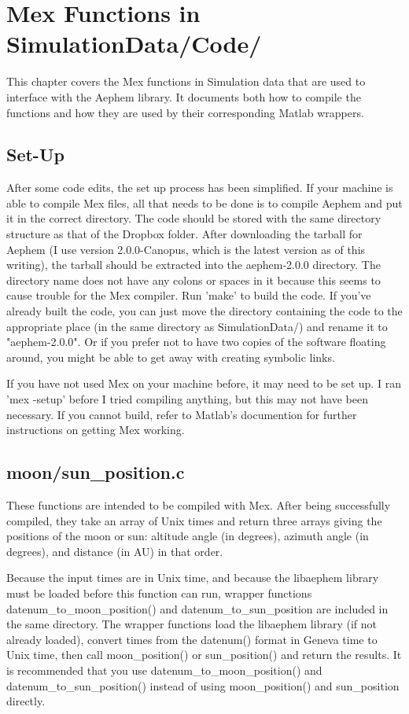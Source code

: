 \documentclass[12pt]{report}
\begin{document}
\chapter{Mex Functions in SimulationData/Code/}
\label{chap:mex_functions}
This chapter covers the Mex functions in Simulation data that are used to interface with the Aephem library.  It documents both how to compile the functions and how they are used by their corresponding Matlab wrappers.

\section{Set-Up}
After some code edits, the set up process has been simplified.  If your machine is able to compile Mex files, all that needs to be done is to compile Aephem and put it in the correct directory.  The code should be stored with the same directory structure as that of the Dropbox folder.  After downloading the tarball for Aephem (I use version 2.0.0-Canopus, which is the latest version as of this writing), the tarball should be extracted into the aephem-2.0.0 directory.  The directory name does not have any colons or spaces in it because this seems to cause trouble for the Mex compiler.  Run 'make' to build the code.  If you've already built the code, you can just move the directory containing the code to the appropriate place (in the same directory as SimulationData/) and rename it to "aephem-2.0.0".  Or if you prefer not to have two copies of the software floating around, you might be able to get away with creating symbolic links.

If you have not used Mex on your machine before, it may need to be set up.  I ran 'mex -setup' before I tried compiling anything, but this may not have been necessary.  If you cannot build, refer to Matlab's documention for further instructions on getting Mex working.

\section{moon/sun\_position.c}
These functions are intended to be compiled with Mex.  After being successfully compiled, they take an array of Unix times and return three arrays giving the positions of the moon or sun: altitude angle (in degrees), azimuth angle (in degrees), and distance (in AU) in that order.

Because the input times are in Unix time, and because the libaephem library must be loaded before this function can run, wrapper functions datenum\_to\_moon\_position() and datenum\_to\_sun\_position are included in the same directory.  The wrapper functions load the libaephem library (if not already loaded), convert times from the datenum() format in Geneva time to Unix time, then call moon\_position() or sun\_position() and return the results.  It is recommended that you use datenum\_to\_moon\_position() and datenum\_to\_sun\_position() instead of using moon\_position() and sun\_position directly.
\end{document}
